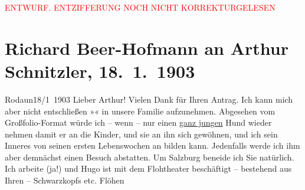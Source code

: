 
\begin{center}
            \textcolor{red}{ENTWURF. ENTZIFFERUNG NOCH NICHT KORREKTURGELESEN}
                      \end{center}
            
               \section[Richard Beer-Hofmann an Arthur Schnitzler, 18. 1. 1903]{ Richard Beer-Hofmann an Arthur Schnitzler,
               18. 1. 1903}\nopagebreak{}\rehead{ }\begin{ledgroupsized}[t]{13cm}\normalsize\beginnumbering{} \toendnotes[C]{\smallbreak\pagebreak[2]} 
\toendnotes[C]{\smallbreak}\pstart
           \raggedleft{}{\pb}Rodaun18/1 1903\pend
           \pstart
           Lieber Arthur! Vielen Dank für Ihren Antrag. Ich kann mich aber
               nicht entschließen »\label{K_L01267_1v}\label{K_L01267_1h}« in unsere
               Familie aufzunehmen. Abgesehen vom Großfolio-Format würde ich – wenn – nur einen \uline{ganz jungen} Hund wieder nehmen damit er an die Kinder,
               und sie an ihn sich gewöhnen, und ich sein Inneres von seinen ersten Lebenswochen an
               bilden kann. Jedenfalls werde ich ihm aber demnächst einen Besuch abstatten. Um Salzburg beneide ich Sie na{\pb}türlich. Ich arbeite (ja!) und Hugo ist mit dem Flohtheater beschäftigt –
               bestehend aus Ihren – Schwarzkopfs etc. Flöhen

\end{ledgroupsized}

